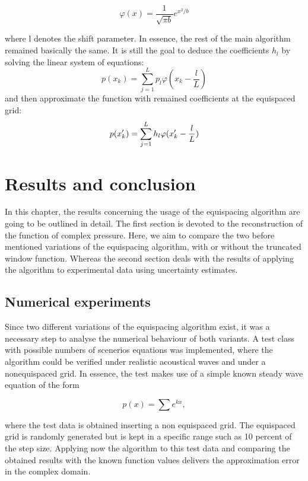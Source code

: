 \documentclass[11pt]{report} %
\begin{document}
\begin{equation}
\varphi(x)= \frac{1}{\sqrt{\pi b}}  e^{x^2/b}
\end{equation}

where l denotes the shift parameter.
In essence, the rest of the main algorithm remained basically the same.
It is still the goal to deduce the coefficients $h_{l}$ by solving the linear system of equations: 
\begin{equation}
p(x_{k})=\sum\limits_{j=1}^L p_{l}\varphi(x_{k}-\frac{l}{L})
\end{equation}
and then approximate the function with remained coefficients at the equispaced grid: 
\begin{equation}
p(x'_{k})= \sum\limits_{j=1}^L h_{l}\varphi(x'_{k}-\frac{l}{L}) \notag
\end{equation}


\chapter{Results and conclusion}
In this chapter, the results concerning the usage of the equispacing algorithm are going to be outlined in detail. 
The first section is devoted to the reconstruction of the function of complex pressure.
Here, we aim to compare the two before mentioned variations of the equispacing algorithm, with or without the truncated window function. 
Whereas the second section deals with the results of applying the algorithm to experimental data using uncertainty estimates. 
 
\section{Numerical experiments}
Since two different variations of the equispacing algorithm exist, it was a necessary step to analyse the numerical behaviour of both variants.
A test class with possible numbers of scenerios equations was implemented, where the  
algorithm could be verified under realistic acoustical waves and under a nonequispaced grid.
In essence, the test makes use of a simple known steady wave equation of the form

\begin{equation}
p(x)= \sum e^{kx},
\end{equation}

where the test data is obtained inserting a non equispaced grid. 
The equispaced grid is randomly generated but is kept in a specific range such as 10 percent of the step size. 
Applying now the algorithm to this test data and comparing the obtained results with the known function values delivers the approximation error in the complex domain.
\end{document}
